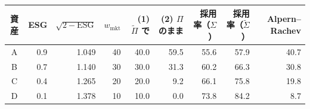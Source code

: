 \begin{tabular}{crrrrrrrr}
\toprule
資産 & ESG & $\sqrt{2-\mathrm{ESG}}$ & $w_{\mathrm{mkt}}$ & (1) $\tilde\Pi$ で & (2) $\Pi$ のまま & 採用率（$\Sigma$） & 採用率（$\tilde\Sigma$） & Alpern–Rachev \\
\midrule
A & 0.9 & 1.049 & 40 & 40.0 & 59.5 & 55.6 & 57.9 & 40.7 \\
B & 0.7 & 1.140 & 30 & 30.0 & 31.3 & 60.2 & 66.3 & 30.8 \\
C & 0.4 & 1.265 & 20 & 20.0 & 9.2 & 66.1 & 75.8 & 19.8 \\
D & 0.1 & 1.378 & 10 & 10.0 & 0.0 & 73.8 & 84.2 & 8.7 \\
\bottomrule
\end{tabular}
